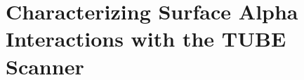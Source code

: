
 
\chapter {Characterizing Surface Alpha Interactions with the TUBE Scanner}\label{ch:TUBE_analysis}

